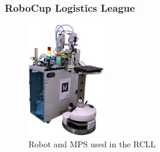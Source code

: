 \documentclass[a4paper,11pt]{article}
\begin{document}


\subsubsection{RoboCup Logistics League}
\begin{figure}
  \centering
  \vspace{-2.7ex}
  \includegraphics[width=0.3\textwidth]{img/rcll}
  \vspace{-4ex}
  \caption{Robot and MPS used in the RCLL}
  \label{fig:rcll}
\end{figure}
\end{document}
